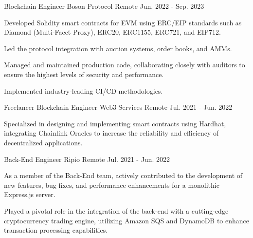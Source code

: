 

\begin{cventries}

\cventry
  {Blockchain Engineer} %
  {Boson Protocol} %
  {Remote} %
  {Jun. 2022 - Sep. 2023} %
  {
    \begin{cvitems} %
      \item {Developed Solidity smart contracts for EVM using ERC/EIP standards such as Diamond (Multi-Facet Proxy), ERC20, ERC1155, ERC721, and EIP712.}
      \item {Led the protocol integration with auction systems, order books, and AMMs.}
      \item {Managed and maintained production code, collaborating closely with auditors to ensure the highest levels of security and performance.}
      \item {Implemented industry-leading CI/CD methodologies.}
    \end{cvitems}
  }


\cventry
  {Freelancer Blockchain Engineer} %
  {Web3 Services} %
  {Remote} %
  {Jul. 2021 - Jun. 2022} %
{
    \begin{cvitems}
      \item {Specialized in designing and implementing smart contracts using Hardhat, integrating Chainlink Oracles to increase the reliability and efficiency of decentralized applications.}
    \end{cvitems}
  }

\cventry
  {Back-End Engineer} %
  {Ripio} %
  {Remote} %
  {Jul. 2021 - Jun. 2022} %
  {
    \begin{cvitems}
      \item {As a member of the Back-End team, actively contributed to the development of new features, bug fixes, and performance enhancements for a monolithic Express.js server.}
      \item {Played a pivotal role in the integration of the back-end with a cutting-edge cryptocurrency trading engine, utilizing Amazon SQS and DynamoDB to enhance transaction processing capabilities.}
    \end{cvitems}
  }


\end{cventries}
